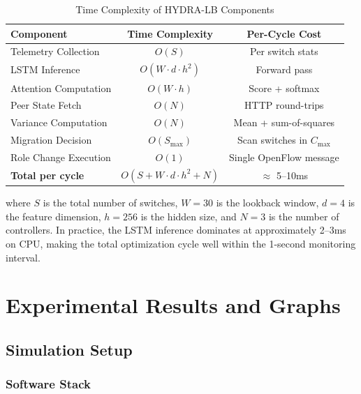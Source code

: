 \documentclass[12pt,a4paper]{report}
\begin{document}
\begin{table}[H]
\centering
\caption{Time Complexity of HYDRA-LB Components}
\label{tab:complexity}
\begin{tabular}{lcc}
\toprule
\textbf{Component} & \textbf{Time Complexity} & \textbf{Per-Cycle Cost} \\
\midrule
Telemetry Collection & $O(S)$ & Per switch stats \\
LSTM Inference & $O(W \cdot d \cdot h^2)$ & Forward pass \\
Attention Computation & $O(W \cdot h)$ & Score + softmax \\
Peer State Fetch & $O(N)$ & HTTP round-trips \\
Variance Computation & $O(N)$ & Mean + sum-of-squares \\
Migration Decision & $O(S_{\max})$ & Scan switches in $C_{\max}$ \\
Role Change Execution & $O(1)$ & Single OpenFlow message \\
\midrule
\textbf{Total per cycle} & $O(S + W \cdot d \cdot h^2 + N)$ & $\approx$ 5--10ms \\
\bottomrule
\end{tabular}
\end{table}

\noindent where $S$ is the total number of switches, $W = 30$ is the lookback window, $d = 4$ is the feature dimension, $h = 256$ is the hidden size, and $N = 3$ is the number of controllers. In practice, the LSTM inference dominates at approximately 2--3ms on CPU, making the total optimization cycle well within the 1-second monitoring interval.

\chapter{Experimental Results and Graphs}

\section{Simulation Setup}

\subsection{Software Stack}
\end{document}
